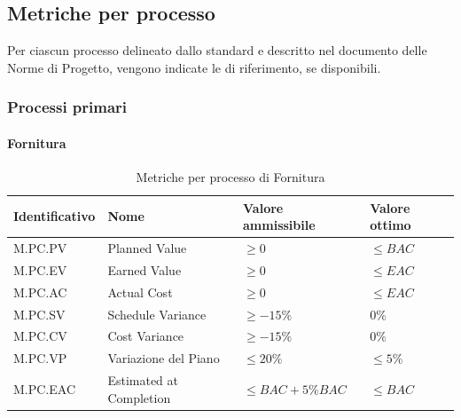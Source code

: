 \subsection{Metriche per processo}
\label{subsec:processi_metriche}
Per ciascun processo delineato dallo standard  e descritto nel documento delle Norme di Progetto, 
vengono indicate le  di riferimento, se disponibili.

\subsubsection{Processi primari}
\paragraph{Fornitura}
\begin{table}[H]
    \centering
    \begin{tabular}{| l | l | l | l |}
    \hline
    \textbf{Identificativo} & 
    \textbf{Nome} &
    \textbf{Valore ammissibile} &
    \textbf{Valore ottimo}\\
    \hline
        M.PC.PV & Planned Value & $\geq 0$ & $\leq BAC$ \\
    \hline
        M.PC.EV & Earned Value & $\geq 0$ & $\leq EAC$ \\
    \hline
        M.PC.AC & Actual Cost & $\geq 0$ & $\leq EAC$ \\
    \hline
        M.PC.SV & Schedule Variance & $\geq -15\%$ & $0\%$ \\
    \hline
        M.PC.CV & Cost Variance & $\geq -15\%$ & $0\%$ \\
    \hline  
        M.PC.VP & Variazione del Piano & $\leq 20\%$ & $\leq 5\%$ \\
    \hline
        M.PC.EAC & Estimated at Completion & $\leq BAC+5\% BAC$ & $\leq BAC$ \\
    \hline
\end{tabular}
\caption{Metriche per processo di Fornitura}
\label{tab:metriche_fornitura} 
\end{table}

